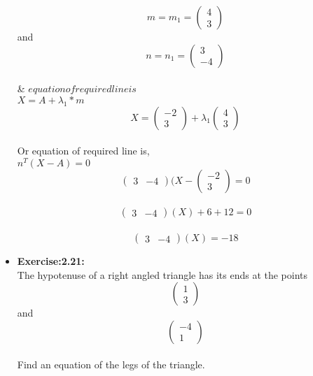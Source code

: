 \documentclass{article}
\begin{document}
\begin{itemize}
\[m=m_1= \begin{pmatrix} 4 \\ 3\end{pmatrix}\] and\\
\[ n=n_1=\begin{pmatrix} 3 \\ -4\end{pmatrix}\]\\

\therefore{}& $equation of required line is$\\

\hspace{4.5 cm}$X=A+ {\lambda}_1*m$\\

\[ X=\begin{pmatrix} -2 \\ 3\end{pmatrix}+ {\lambda}_1\begin{pmatrix} 4 \\ 3\end{pmatrix}\]\\

Or equation of required line is,\\

\hspace{4.5 cm}$n^{T}(X-A)=0$\\
\[ \begin{pmatrix} 3 & -4\end{pmatrix}(X-\begin{pmatrix} -2 \\ 3\end{pmatrix}=0\]\\
\[ \begin{pmatrix} 3 & -4\end{pmatrix}(X)+6+12=0\]\\
\[ \begin{pmatrix} 3 & -4\end{pmatrix}(X)=-18\]
\newpage
\item{\textbf{Exercise:2.21:}}\\

The hypotenuse of a right angled triangle has its ends at the points \[ \begin{pmatrix} 1 \\ 3\end{pmatrix}\] and \[ \begin{pmatrix} -4\\ 1\end{pmatrix}\]\\Find an equation of the legs of the triangle.


\end{itemize}
\end{document}

